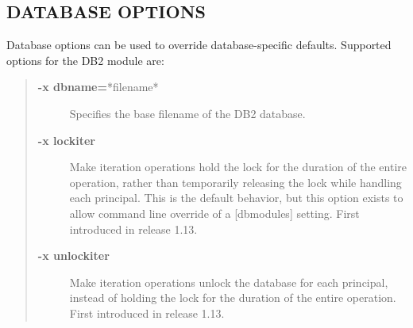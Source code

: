 \documentclass[letterpaper,10pt,english]{sphinxmanual}
\begin{document}
\subsection{DATABASE OPTIONS}
\label{admin/admin_commands/kadmin_local:database-options}\label{admin/admin_commands/kadmin_local:dboptions}\label{admin/admin_commands/kadmin_local:kadmin-options-end}
Database options can be used to override database-specific defaults.
Supported options for the DB2 module are:
\begin{quote}
\begin{description}
\item[{\textbf{-x dbname=}*filename*}] \leavevmode
Specifies the base filename of the DB2 database.

\item[{\textbf{-x lockiter}}] \leavevmode
Make iteration operations hold the lock for the duration of
the entire operation, rather than temporarily releasing the
lock while handling each principal.  This is the default
behavior, but this option exists to allow command line
override of a {[}dbmodules{]} setting.  First introduced in
release 1.13.

\item[{\textbf{-x unlockiter}}] \leavevmode
Make iteration operations unlock the database for each
principal, instead of holding the lock for the duration of the
entire operation.  First introduced in release 1.13.

\end{description}
\end{quote}
\end{document}
